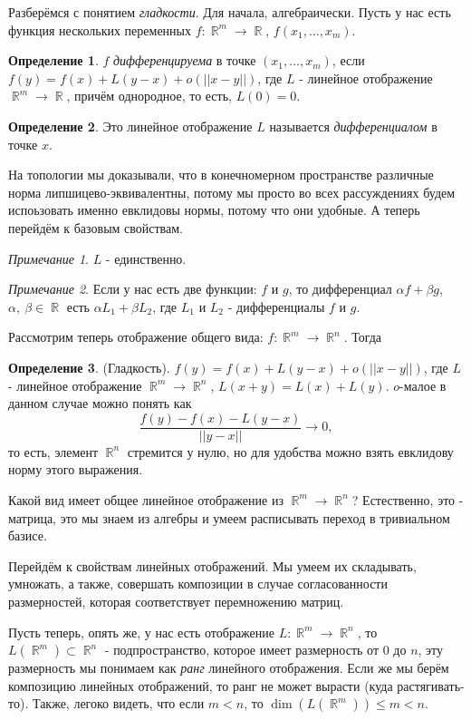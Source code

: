\documentclass[a4paper,100pt]{article}
\theoremstyle{indented}
\theoremstyle{definition}
\newtheorem{defn}{Определение}
\theoremstyle{remark}
\newtheorem{remark}{Примечание}
\DeclareMathOperator{\RR}{\mathbb{R}}
\begin{document}
Разберёмся с понятием \textit{гладкости}. Для начала, алгебраически. Пусть у нас есть функция нескольких переменных $f:\RR^m\rightarrow \RR$, $f(x_1, \ldots, x_m)$. 

\begin{defn}
    $f$ \textit{дифференцируема} в точке $(x_1, \ldots, x_m)$, если $f(y)=f(x)+L(y-x)+o(||x-y||)$, где $L$ - линейное отображение $\RR^m\rightarrow \RR$, причём однородное, то есть, $L(0)=0$. 
\end{defn}

\begin{defn}
    Это линейное отображение $L$ называется \textit{дифференциалом} в точке $x$.
\end{defn}

На топологии мы доказывали, что в конечномерном пространстве различные норма липшицево-эквивалентны, потому мы просто во всех рассуждениях будем испоьзовать именно евклидовы нормы, потому что они удобные. А теперь перейдём к базовым свойствам. 

\begin{remark}
    $L$ - единственно.
\end{remark}

\begin{remark}
    Если у нас есть две функции: $f$ и $g$, то дифференциал $\alpha f+\beta g$, $\alpha, \: \beta \in \RR$ есть $\alpha L_1+\beta L_2$, где $L_1$ и $L_2$ - дифференциалы $f$ и $g$. 
\end{remark}

Рассмотрим теперь отображение общего вида: $f:\RR^m\rightarrow \RR^n$. Тогда 
\begin{defn}
    (Гладкость). $f(y)=f(x)+L(y-x)+o(||x-y||)$, где $L$ - линейное отображение $\RR^m\rightarrow \RR^n$, $L(x+y)=L(x)+L(y)$. $o$-малое в данном случае можно понять как 
    \[
        \frac{f(y)-f(x)-L(y-x)}{||y-x||}\rightarrow 0,
    \]
    то есть, элемент $\RR^n$ стремится у нулю, но для удобства можно взять евклидову норму этого выражения.
\end{defn}

Какой вид имеет общее линейное отображение из $\RR^m\rightarrow \RR^n$? Естественно, это - матрица, это мы знаем из алгебры и умеем расписывать переход в тривиальном базисе. \ 

Перейдём к свойствам линейных отображений. Мы умеем их складывать, умножать, а также, совершать композиции в случае согласованности размерностей, которая соответствует перемножению матриц. \ 

Пусть теперь, опять же, у нас есть отображение $L: \RR^m\rightarrow \RR^n$, то $L(\RR^m)\subset \RR^n$ - подпространство, которое имеет размерность от $0$ до $n$, эту размерность мы понимаем как \textit{ранг} линейного отображения. Если же мы берём композицию линейных отображений, то ранг не может вырасти (куда растягивать-то). Также, легоко видеть, что если $m<n$, то $\dim(L(\RR^m))\leq m<n$. \ 
\end{document}
